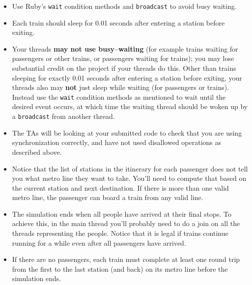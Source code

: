 \documentclass[11pt]{article}
\begin{document}
\begin{itemize}
        \item Use Ruby's \texttt{wait} condition methods and
              \texttt{broadcast} to avoid busy waiting.

        \item Each train should sleep for 0.01 seconds after entering a
              station before exiting.

        \item Your threads \textbf{may not use busy--waiting} (for example
              trains waiting for passengers or other trains, or passengers
              waiting for trains); you may lose substantial credit on the
              project if your threads do this.  Other than trains sleeping
              for exactly 0.01 seconds after entering a station before
              exiting, your threads also may \textbf{not} just sleep while
              waiting (for passengers or trains).  Instead use the
              \texttt{wait} condition methods as mentioned to wait until the
              desired event occurs, at which time the waiting thread should
              be woken up by a \texttt{broadcast} from another thread.

        \item The TAs will be looking at your submitted code to check that
              you are using synchronization correctly, and have not used
              disallowed operations as described above.

        \item Notice that the list of stations in the itinerary for each
              passenger does not tell you what metro line they want to
              take.  You'll need to compute that based on the current station
              and next destination.  If there is more than one valid metro
              line, the passenger can board a train from any valid line.

        \item The simulation ends when all people have arrived at their
              final stops.  To achieve this, in the main thread you'll
              probably need to do a join on all the threads representing the
              people.  Notice that it is legal if trains continue running
              for a while even after all passengers have arrived.

        \item If there are no passengers, each train must complete at least
              one round trip from the first to the last station (and back)
              on its metro line before the simulation ends.


\end{itemize}
\end{document}
